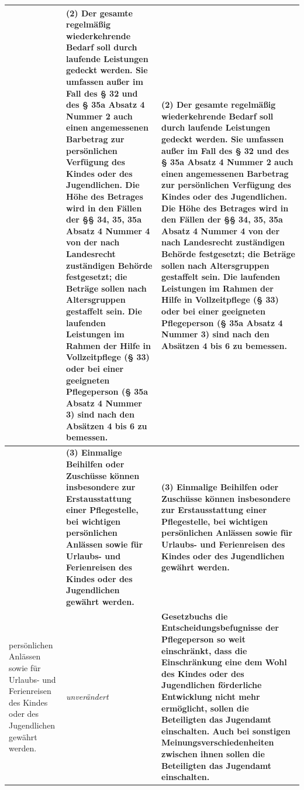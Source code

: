 \documentclass[10pt,a4paper,landscape]{article}
\begin{document}
\begin{longtable}{|L{8.6cm}|L{8.6cm}|L{8.6cm}|}
 & \textbf{(2) Der gesamte regelmäßig wiederkehrende Bedarf soll durch laufende Leistungen gedeckt werden. Sie umfassen außer im Fall des \S{} 32 und des \S{} 35a Absatz 4 Nummer 2 auch einen angemessenen Barbetrag zur persönlichen Verfügung des Kindes oder des Jugendlichen. Die Höhe des Betrages wird in den Fällen der \S{}\S{} 34, 35, 35a Absatz 4 Nummer 4 von der nach Landesrecht zuständigen Behörde festgesetzt; die Beträge sollen nach Altersgruppen gestaffelt sein. Die laufenden Leistungen im Rahmen der Hilfe in Vollzeitpflege (\S{} 33) oder bei einer geeigneten Pflegeperson (\S{} 35a Absatz 4 Nummer 3) sind nach den Absätzen 4 bis 6 zu bemessen. } & \textbf{(2) Der gesamte regelmäßig wiederkehrende Bedarf soll durch laufende Leistungen gedeckt werden. Sie umfassen außer im Fall des \S{} 32 und des \S{} 35a Absatz 4 Nummer 2 auch einen angemessenen Barbetrag zur persönlichen Verfügung des Kindes oder des Jugendlichen. Die Höhe des Betrages wird in den Fällen der \S{}\S{} 34, 35, 35a Absatz 4 Nummer 4 von der nach Landesrecht zuständigen Behörde festgesetzt; die Beträge sollen nach Altersgruppen gestaffelt sein. Die laufenden Leistungen im Rahmen der Hilfe in Vollzeitpflege (\S{} 33) oder bei einer geeigneten Pflegeperson (\S{} 35a Absatz 4 Nummer 3) sind nach den Absätzen 4 bis 6 zu bemessen. } \\
\hline
 & \textbf{(3) Einmalige Beihilfen oder Zuschüsse können insbesondere zur Erstausstattung einer Pflegestelle, bei wichtigen persönlichen Anlässen sowie für Urlaubs- und Ferienreisen des Kindes oder des Jugendlichen gewährt werden. } & \textbf{(3) Einmalige Beihilfen oder Zuschüsse können insbesondere zur Erstausstattung einer Pflegestelle, bei wichtigen persönlichen Anlässen sowie für Urlaubs- und Ferienreisen des Kindes oder des Jugendlichen gewährt werden. } \\
\hline
persönlichen Anlässen sowie für Urlaubs- und Ferienreisen des Kindes oder des Jugendlichen gewährt werden. & \textit{unverändert} & \textbf{Gesetzbuchs die Entscheidungsbefugnisse der Pflegeperson so weit einschränkt, dass die Einschränkung eine dem Wohl des Kindes oder des Jugendlichen förderliche Entwicklung nicht mehr ermöglicht, sollen die Beteiligten das Jugendamt einschalten. Auch bei sonstigen Meinungsverschiedenheiten zwischen ihnen sollen die Beteiligten das Jugendamt einschalten. } \\
\hline

\end{longtable}
\end{document}
